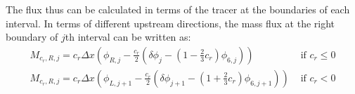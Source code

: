 

The flux thus can be calculated in terms of the tracer at the boundaries of each interval. In terms of different upstream directions, the mass flux at the right boundary of $j$th interval can be written as:
\begin{eqnarray} \label{eq:2.10}
M_{c_r,R,j} = c_r \Delta x (\phi_{R,j}-\frac{c_r}{2}(\delta \phi_j-(1-\frac{2}{3} c_r)\phi_{6,j})) & \text{ if $c_r$} \le 0 \nonumber \\
M_{c_r,R,j} = c_r \Delta x (\phi_{L,j+1}-\frac{c_r}{2}(\delta \phi_{j+1}-(1+\frac{2}{3} c_r)\phi_{6,j+1})) & \text{ if  $c_r$} < 0
\end{eqnarray}

